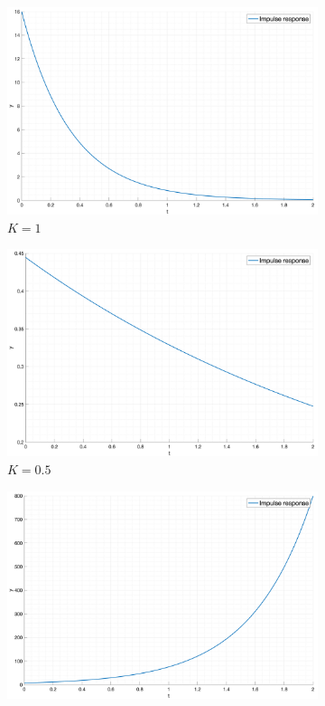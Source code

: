 \begin{figure}[ht!]
    \begin{subfigure}{0.5\textwidth}
        \centering
        \includegraphics[width=\textwidth]{media/plots/task5_impulse_response_closed_1.png}
        \caption{$K = 1$}
    \end{subfigure}
    \begin{subfigure}{0.5\textwidth}
        \centering
        \includegraphics[width=\textwidth]{media/plots/task5_impulse_response_closed_2.png}
        \caption{$K = 0.5$}
    \end{subfigure}
    \begin{subfigure}{0.5\textwidth}
        \centering
        \includegraphics[width=\textwidth]{media/plots/task5_impulse_response_closed_3.png}

\end{subfigure}
\end{figure}
